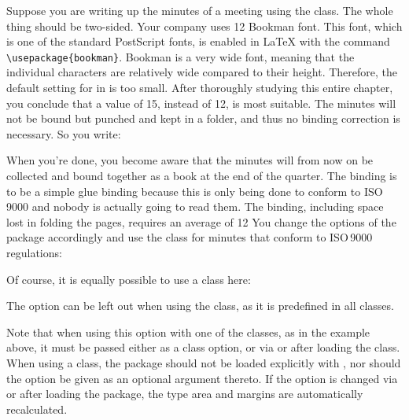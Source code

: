 \begin{Example}
  Suppose you are writing up the minutes of a meeting using the
   class. The whole thing should be two-sided. Your company
  uses 12 Bookman font. This font, which is one of the standard
  PostScript fonts, is enabled in {\LaTeX} with the command
  \verb|\usepackage{bookman}|. Bookman is a very wide font, meaning that the
  individual characters are relatively wide compared to their height.
  Therefore, the default setting for  in  is too
  small. After thoroughly studying this entire chapter, you conclude that a
  value of 15, instead of 12, is most suitable. The minutes will not be bound
  but punched and kept in a folder, and thus no binding correction is
  necessary. So you write:
  When you're done, you become aware that the minutes will from now on be
  collected and bound together as a book at the end of the quarter. The
  binding is to be a simple glue binding because this is only being done to
  conform to ISO\,9000 and nobody is actually going to read them. The binding,
  including space lost in folding the pages, requires an average of
  12 You change the options of the  package
  accordingly and use the class for minutes that conform to ISO\,9000
  regulations:
  Of course, it is equally possible to use a {\KOMAScript} class here:
  The  option can be left out when using the
   class, as it is predefined in all {\KOMAScript}
  classes.
\end{Example}

Note that when using this option with one of the
{\KOMAScript} classes, as in the example above, it must be passed either as a
class option, or via  or
 after loading the class. When using a
{\KOMAScript} class, the  package should not be loaded
explicitly with , nor should the option be
given as an optional argument thereto. If the option is changed via
 or 
after loading the package, the type area and margins are automatically
recalculated.%
\EndIndexGroup


